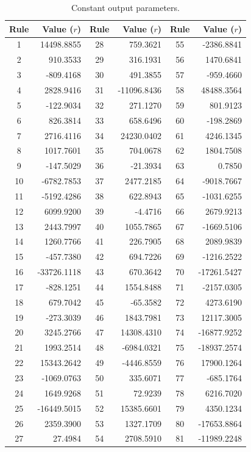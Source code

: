 \documentclass[12pt]{article}
\begin{document}
\begin{table}[H]
\centering
\small %
\begin{tabular}{|c|r||c|r||c|r|}
\hline
\textbf{Rule} & \textbf{Value ($r$)} & \textbf{Rule} & \textbf{Value ($r$)} & \textbf{Rule} & \textbf{Value ($r$)} \\ \hline
1 & 14498.8855 & 28 & 759.3621 & 55 & -2386.8841 \\ \hline
2 & 910.3533 & 29 & 316.1931 & 56 & 1470.6841 \\ \hline
3 & -809.4168 & 30 & 491.3855 & 57 & -959.4660 \\ \hline
4 & 2828.9416 & 31 & -11096.8436 & 58 & 48488.3564 \\ \hline
5 & -122.9034 & 32 & 271.1270 & 59 & 801.9123 \\ \hline
6 & 826.3814 & 33 & 658.6496 & 60 & -198.2869 \\ \hline
7 & 2716.4116 & 34 & 24230.0402 & 61 & 4246.1345 \\ \hline
8 & 1017.7601 & 35 & 704.0678 & 62 & 1804.7508 \\ \hline
9 & -147.5029 & 36 & -21.3934 & 63 & 0.7850 \\ \hline
10 & -6782.7853 & 37 & 2477.2185 & 64 & -9018.7667 \\ \hline
11 & -5192.4286 & 38 & 622.8943 & 65 & -1031.6255 \\ \hline
12 & 6099.9200 & 39 & -4.4716 & 66 & 2679.9213 \\ \hline
13 & 2443.7997 & 40 & 1055.7865 & 67 & -1669.5106 \\ \hline
14 & 1260.7766 & 41 & 226.7905 & 68 & 2089.9839 \\ \hline
15 & -457.7380 & 42 & 694.7226 & 69 & -1216.2522 \\ \hline
16 & -33726.1118 & 43 & 670.3642 & 70 & -17261.5427 \\ \hline
17 & -828.1251 & 44 & 1554.8488 & 71 & -2157.0305 \\ \hline
18 & 679.7042 & 45 & -65.3582 & 72 & 4273.6190 \\ \hline
19 & -273.3039 & 46 & 1843.7981 & 73 & 12117.3005 \\ \hline
20 & 3245.2766 & 47 & 14308.4310 & 74 & -16877.9252 \\ \hline
21 & 1993.2514 & 48 & -6984.0321 & 75 & -18937.2574 \\ \hline
22 & 15343.2642 & 49 & -4446.8559 & 76 & 17900.1264 \\ \hline
23 & -1069.0763 & 50 & 335.6071 & 77 & -685.1764 \\ \hline
24 & 1649.9268 & 51 & 72.9239 & 78 & 6216.7020 \\ \hline
25 & -16449.5015 & 52 & 15385.6601 & 79 & 4350.1234 \\ \hline
26 & 2359.3900 & 53 & 1327.1709 & 80 & -17653.8864 \\ \hline
27 & 27.4984 & 54 & 2708.5910 & 81 & -11989.2248 \\ \hline
\end{tabular}
\label{tab:outputBaC}
\caption{Constant output parameters.}
\end{table}
\end{document}
